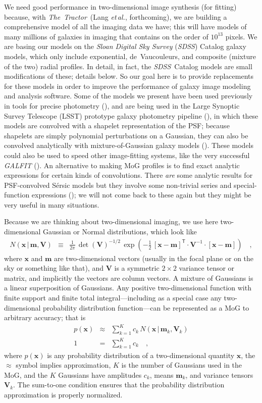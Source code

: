 \documentclass[12pt,pdftex,preprint]{aastex}
\newcommand{\foreign}[1]{\textit{#1}}
\newcommand{\etal}{\foreign{et\,al.}}
\newcommand{\project}[1]{\textsl{#1}}
\newcommand{\thetractor}{\project{The~Tractor}}
\newcommand{\sdss}{\project{SDSS}}
\newcommand{\tmatrix}[1]{\boldsymbol{#1}}
\newcommand{\inverse}[1]{{#1}^{-1}}
\newcommand{\transpose}[1]{{#1}^{\mathsf T}}
\newcommand{\tvector}[1]{\boldsymbol{#1}}
\newcommand{\pos}{\tvector{x}}
\newcommand{\mean}{\tvector{m}}
\newcommand{\var}{\tmatrix{V}}
\newcommand{\normal}{N}
\newcommand{\given}{\,|\,}
\begin{document}
We need good performance in two-dimensional image synthesis (for
fitting) because, with \thetractor\ (Lang \etal, forthcoming), we are
building a comprehensive model of all the imaging data we have; this
will have models of many millions of galaxies in imaging that contains
on the order of $10^{13}$ pixels.  We are basing our models on the
\project{Sloan Digital Sky Survey} (\sdss) Catalog galaxy models,
which only include exponential, de~Vaucouleurs, and composite (mixture
of the two) radial profiles.  In detail, in fact, the \sdss\ Catalog
models are small modifications of these; details below.  So our goal
here is to provide replacements for these models in order to improve
the performance of galaxy image modeling and analysis software.  Some
of the models we present have been used previously in tools for
precise photometry (\citealt{bundy}), and are being used in the Large
Synoptic Survey Telescope (LSST) prototype galaxy photometry pipeline
(\citealt{shaw}), in which these models are convolved with a shapelet
representation of the PSF; because shapelets are simply polynomial
perturbations on a Gaussian, they can also be convolved analytically
with mixture-of-Gaussian galaxy models (\citealt{bosch}).  These
models could also be used to speed other image-fitting systems, like
the very successful \project{GALFIT} (\citealt{galfit}).  An
alternative to making MoG profiles is to find exact analytic
expressions for certain kinds of convolutions.  There \emph{are} some
analytic results for PSF-convolved S\'ersic models but they involve
some non-trivial series and special-function expressions
(\citealt{trujillo}); we will not come back to these again but they
might be very useful in many situations.

Because we are thinking about two-dimensional imaging, we use here
two-dimensional Gaussian or Normal distributions, which look like
\begin{eqnarray}\displaystyle
\normal(\pos\given\mean,\var) &\equiv& \frac{1}{2\pi}\,\det(\var)^{-1/2}\,\exp(-\frac{1}{2}\,\transpose{[\pos-\mean]}\cdot\inverse{\var}\cdot[\pos-\mean])
\quad ,
\end{eqnarray}
where $\pos$ and $\mean$ are two-dimensional vectors (usually in the
focal plane or on the sky or something like that), and $\var$ is a
symmetric $2\times 2$ variance tensor or matrix, and implicitly the
vectors are column vectors.  A mixture of Gaussians is a linear
superposition of Gaussians.  Any positive two-dimensional function
with finite support and finite total integral---including as a special
case any two-dimensional probability distribution function---can be
represented as a MoG to arbitrary accuracy; that is
\begin{eqnarray}
p(\pos) &\approx& \sum_{k=1}^K c_k\,\normal(\pos\given\mean_k,\var_k)
\\
1 &=& \sum_{k=1}^K c_k
\quad ,
\end{eqnarray}
where $p(\pos)$ is any probability distribution of a two-dimensional
quantity $\pos$, the $\approx$ symbol implies approximation, $K$ is
the number of Gaussians used in the MoG, and the $K$ Gaussians
have amplitudes $c_k$, means $\mean_k$, and variance tensors $\var_k$.
The sum-to-one condition ensures that the probability distribution
approximation is properly normalized.
\end{document}
